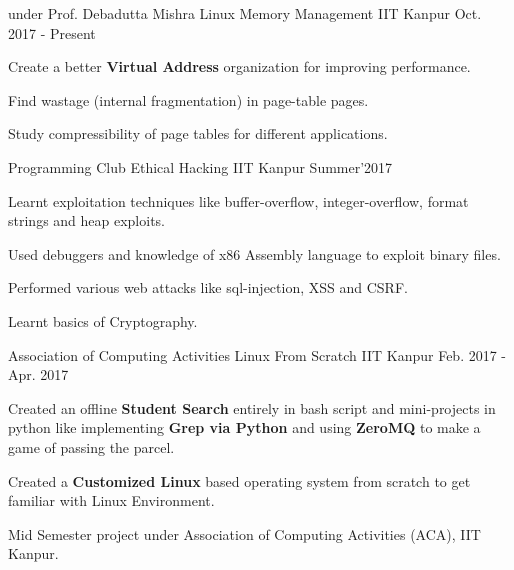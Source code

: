 

\begin{cventries}

  \cventry
    {under Prof. Debadutta Mishra} %
    {Linux Memory Management} %
    {IIT Kanpur} %
    {Oct. 2017 - Present} %
    {
      \begin{cvitems} %
        \item {Create a better \textbf{Virtual Address} organization for improving performance.}
        \item {Find wastage (internal fragmentation) in page-table pages.} 
        \item {Study compressibility of page tables for different applications.}
      \end{cvitems}
    }



  \cventry
    {Programming Club} %
    {Ethical Hacking} %
    {IIT Kanpur} %
    {Summer'2017} %
    {
      \begin{cvitems} %
        \item {Learnt exploitation techniques like buffer-overflow, integer-overflow, format strings and heap exploits.}
        \item {Used debuggers and knowledge of x86 Assembly language to exploit binary files.}
        \item {Performed various web attacks like sql-injection, XSS and CSRF.}
        \item {Learnt basics of Cryptography.}
      \end{cvitems}
    }



  \cventry
    {Association of Computing Activities} %
    {Linux From Scratch} %
    {IIT Kanpur} %
    {Feb. 2017 - Apr. 2017} %
    {
      \begin{cvitems} %
      \item {Created an offline \textbf{Student Search} entirely in bash script and mini-projects in python like implementing \textbf{Grep via Python} and using \textbf{ZeroMQ} to make a game of passing the parcel.}
        \item {Created a \textbf{Customized Linux} based operating system from scratch to get familiar with Linux Environment.}
        \item {Mid Semester project under Association of Computing Activities (ACA), IIT Kanpur.}
      \end{cvitems}
    }

\end{cventries}
